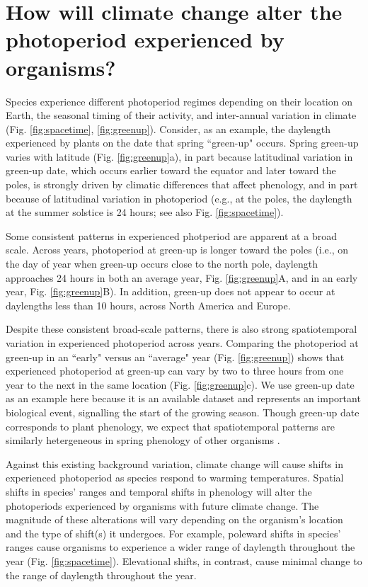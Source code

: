 \documentclass{article}
\begin{document}
\section*{How will climate change alter the photoperiod experienced by organisms?}
\par Species experience different photoperiod regimes depending on their location on Earth, the seasonal timing of their activity, and inter-annual variation in climate (Fig. \ref{fig:spacetime}, \ref{fig:greenup}). Consider, as an example, the daylength experienced by plants on the date that spring ``green-up" occurs. Spring green-up varies with latitude (Fig. \ref{fig:greenup}a), in part because latitudinal variation in green-up date, which occurs earlier toward the equator and later toward the poles, is strongly driven by climatic differences that affect phenology, and in part because of latitudinal variation in photoperiod (e.g., at the poles, the daylength at the summer solstice is 24 hours; see also Fig. \ref{fig:spacetime}). 
\par Some consistent patterns in experienced photperiod are apparent at a broad scale. Across years, photoperiod at green-up is longer toward the poles (i.e., on the day of year when green-up occurs close to the north pole, daylength approaches 24 hours in both an average year, Fig. \ref{fig:greenup}A, and in an early year, Fig. \ref{fig:greenup}B). In addition, green-up does not appear to occur at daylengths less than 10 hours, across North America and Europe. 
\par Despite these consistent broad-scale patterns, there is also strong spatiotemporal variation in experienced photoperiod across years. Comparing the photoperiod at green-up in an ``early" versus an ``average" year (Fig. \ref{fig:greenup}) shows that experienced photoperiod at green-up can vary by two to three hours from one year to the next in the same location (Fig. \ref{fig:greenup}c). We use green-up date as an example here because it is an available dataset and represents an important biological event, signalling the start of the growing season. Though green-up date corresponds to plant phenology, we expect that spatiotemporal patterns are similarly hetergeneous in spring phenology of other organisms \citep{ovaskainen2013, penuelas2002}.

\par Against this existing background variation, climate change will cause shifts in experienced photoperiod as species respond to warming temperatures. Spatial shifts in species' ranges and temporal shifts in phenology will alter the photoperiods experienced by organisms with future climate change. The magnitude of these alterations will vary depending on the organism's location and the type of shift(s) it undergoes. For example, poleward shifts in species' ranges cause organisms to experience a wider range of daylength throughout the year (Fig. \ref{fig:spacetime}). Elevational shifts, in contrast, cause minimal change to the range of daylength throughout the year.
\end{document}
